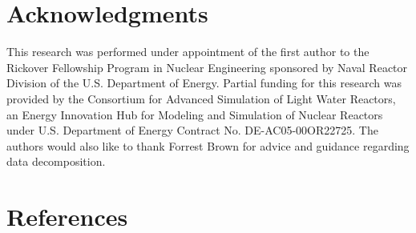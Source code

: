 \documentclass[3p]{elsarticle}
\begin{document}
\section*{Acknowledgments}

This research was performed under appointment of the first author to the
Rickover Fellowship Program in Nuclear Engineering sponsored by Naval Reactor
Division of the U.S. Department of Energy. Partial funding for this research was
provided by the Consortium for Advanced Simulation of Light Water Reactors, an
Energy Innovation Hub for Modeling and Simulation of Nuclear Reactors under
U.S. Department of Energy Contract No. DE-AC05-00OR22725. The authors would also
like to thank Forrest Brown for advice and guidance regarding data
decomposition.

\section*{References}



\end{document}

